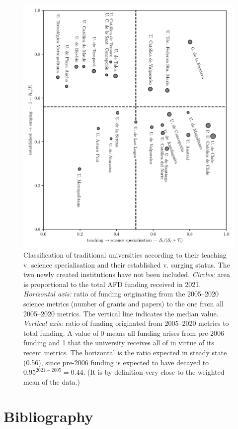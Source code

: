 \documentclass[twocolumn]{article}
\begin{document}
\begin{figure}[p]
\centering
\includegraphics{pdf/afd-specialisation.pdf}
\caption{Classification of traditional universities according to their teaching v. science specialisation and their established v. surging status. The two newly created institutions have not been included. \textit{Circles:} area is proportional to the total AFD funding received in 2021. \textit{Horizontal axis:} ratio of funding originating from the 2005--2020 science metrics (number of grants and papers) to the one from all 2005--2020 metrics. The vertical line indicates the median value. \textit{Vertical axis:} ratio of funding originated from 2005--2020 metrics to total funding.  A value of 0 means all funding arises from pre-2006 funding and 1 that the university receives all of in virtue of its recent metrics. The horizontal is the ratio expected in steady state (0.56), since pre-2006 funding is expected to have decayed to $0.95^{2021-2005} = 0.44$. (It is by definition very close to the weighted mean of the data.)}
\end{figure}


\section*{Bibliography}


\end{document}
